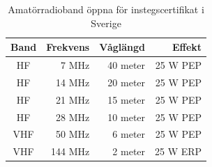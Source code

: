 \begin{table}[H]
\centering
\begin{tabular}{crrr}
  \textbf{Band} & \textbf{Frekvens} & \textbf{Våglängd} & \textbf{Effekt} \\ \hline
   HF           & 7 MHz             & 40 meter          & 25 W PEP        \\
   HF           & 14 MHz            & 20 meter          & 25 W PEP        \\
   HF           & 21 MHz            & 15 meter          & 25 W PEP        \\
   HF           & 28 MHz            & 10 meter          & 25 W PEP        \\ \hline
   VHF          & 50 MHz            & 6 meter           & 25 W PEP        \\
   VHF          & 144 MHz           & 2 meter           & 25 W ERP
\end{tabular}
\caption{Amatörradioband öppna för instegscertifikat i Sverige}
\end{table}
